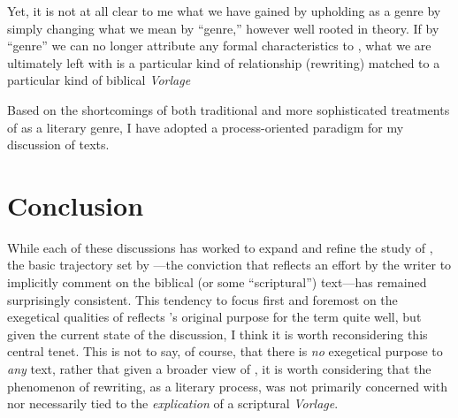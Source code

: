 Yet, it is not at all clear to me what we have gained by upholding
\rwb as a genre by simply changing what we mean by
``genre,'' however well rooted in theory.\autocite[Machiela critiques
Zahn's approach for similar reasons. See][]{machiela_jjs2010} If by
``genre'' we can no longer attribute any formal characteristics to
\rwb, what we are ultimately left with is a particular
kind of relationship (rewriting) matched to a particular kind of
biblical \emph{Vorlage}

Based on the shortcomings of both traditional and more sophisticated
treatments of \rwb as a literary genre, I have adopted a
process-oriented paradigm for my discussion of \rwb
texts.\autocite[I am in broad agreement with Campbell's treatment of the
matter. See][64--67]{campbell_zsengeller2014}

\hypertarget{conclusion}{%
\section{Conclusion}\label{conclusion}}

While each of these discussions has worked to expand and refine the
study of \rwb, the basic trajectory set by
\vermes---the conviction that \rwb
reflects an effort by the writer to implicitly comment on the biblical
(or some ``scriptural'') text---has remained surprisingly consistent.
This tendency to focus first and foremost on the exegetical qualities of
\rwb reflects \vermes's original purpose
for the term quite well, but given the current state of the discussion,
I think it is worth reconsidering this central tenet. This is not to
say, of course, that there is \emph{no} exegetical purpose to \emph{any}
\rwb text, rather that given a broader view of
\rwb, it is worth considering that the phenomenon of
rewriting, as a literary process, was not primarily concerned with nor
necessarily tied to the \emph{explication} of a scriptural
\emph{Vorlage}.

